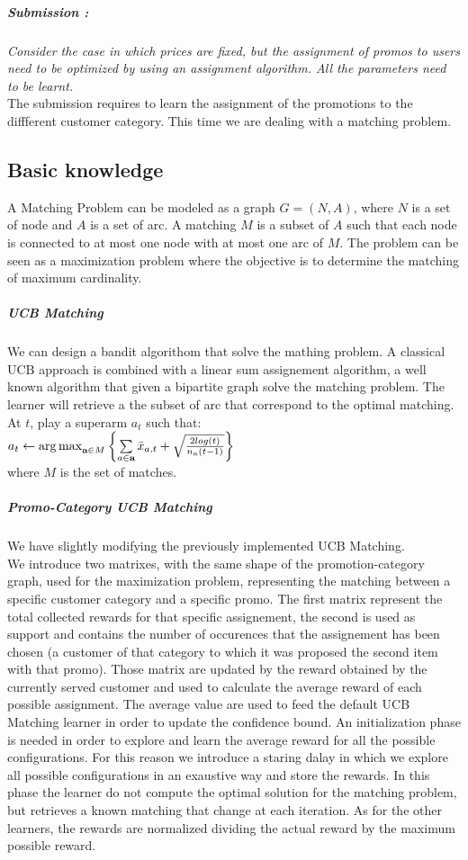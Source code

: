 \subparagraph*{Submission : }
\textit{Consider the case in which prices are fixed, but the assignment of promos to users need to be optimized by using an assignment algorithm. All the parameters need to be learnt.}\\

The submission requires to learn the assignment of the promotions to the diffferent customer category. This time we are dealing with a matching problem. 

\subsection*{Basic knowledge}
A Matching Problem can be modeled as a graph $G=(N,A)$, where $N$ is a set of node and $A$ is a set of arc. A matching $M$ is a subset of $A$ such that each node is connected to at most one node with at most one arc of $M$. The problem can be seen as a maximization problem where the objective is to determine the matching of maximum cardinality.\\

\subparagraph*{UCB Matching}
We can design a bandit algorithom that solve the mathing problem. A classical UCB approach is combined with a linear sum assignement algorithm, a well known algorithm that given a bipartite graph solve the matching problem. The learner will retrieve a the subset of arc that correspond to the optimal matching. 
At $t$, play a superarm $a_{t}$ such that:\\
$a_{t} \leftarrow \operatorname{arg\,max}\limits_{\textbf{a} \in M}{\left\{\sum\limits_{a \in \textbf{a}}\bar{x}_{a,t} + \sqrt{\frac{2 log(t)}{{n_{a}(t-1)}} }\right\}}$ \\
where $M$ is the set of matches.

\subparagraph*{Promo-Category UCB Matching}

We have slightly modifying the previously implemented UCB Matching. \\
We introduce two matrixes, with the same shape of the promotion-category graph, used for the maximization problem, representing the matching between a specific customer category and a specific promo. The first matrix represent the total collected rewards for that specific assignement, the second is used as support and contains the number of occurences that the assignement has been chosen (a customer of that category to which it was proposed the second item with that promo). 
Those matrix are updated by the reward obtained by the currently served customer and used to calculate the average reward of each possible assignment. The average value are used to feed the default UCB Matching learner in order to update the confidence bound.
An initialization phase is needed in order to explore and learn the average reward for all the possible configurations. For this reason we introduce a staring dalay in which we explore all possible configurations in an exaustive way and store the rewards. In this phase the learner do not compute the optimal solution for the matching problem, but retrieves a known matching that change at each iteration.
As for the other learners, the rewards are normalized dividing the actual reward by the maximum possible reward.

